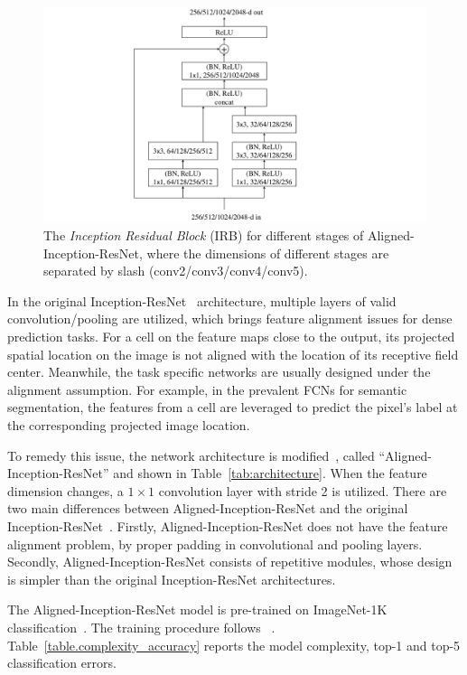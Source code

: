 \documentclass[10pt,twocolumn,letterpaper]{article}
\begin{document}
\begin{figure}
  \centering
  \includegraphics[width=0.95\linewidth]{residual_inception_module_v4.pdf}
\caption{The \textit{Inception Residual Block} (IRB) for different stages of Aligned-Inception-ResNet, where the dimensions of different stages are separated by slash (conv2/conv3/conv4/conv5).}
\label{fig.inception_residual_module_v4}
\end{figure}

In the original Inception-ResNet~\cite{szegedy2016inception} architecture, multiple layers of valid convolution/pooling are utilized, which brings feature alignment issues for dense prediction tasks. For a cell on the feature maps close to the output, its projected spatial location on the image is not aligned with the location of its receptive field center. Meanwhile, the task specific networks are usually designed under the alignment assumption. For example, in the prevalent FCNs for semantic segmentation, the features from a cell are leveraged to predict the pixel’s label at the corresponding projected image location.

To remedy this issue, the network architecture is modified~\cite{he2016aligned}, called ``Aligned-Inception-ResNet'' and shown in Table~\ref{tab:architecture}. When the feature dimension changes, a $1\times 1$ convolution layer with stride 2 is utilized. There are two main differences between Aligned-Inception-ResNet and the original Inception-ResNet~\cite{szegedy2016inception}. Firstly, Aligned-Inception-ResNet does not have the feature alignment problem, by proper padding in convolutional and pooling layers. Secondly, Aligned-Inception-ResNet consists of repetitive modules, whose design is simpler than the original Inception-ResNet architectures.

The Aligned-Inception-ResNet model is pre-trained on ImageNet-1K classification~\cite{deng2009imagenet}. The training procedure follows ~\cite{he2016deep}. Table~\ref{table.complexity_accuracy} reports the model complexity, top-1 and top-5 classification errors.

{\small


}
\end{document}

